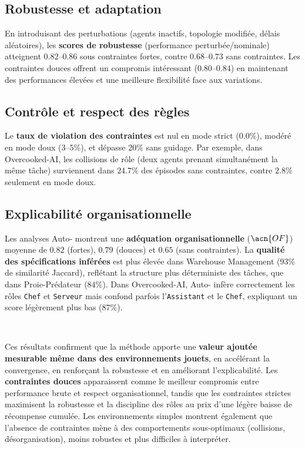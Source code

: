 \subsection*{Robustesse et adaptation}

En introduisant des perturbations (agents inactifs, topologie modifiée, délais aléatoires), les \textbf{scores de robustesse} (performance perturbée/nominale) atteignent $0.82$–$0.86$ sous contraintes fortes, contre $0.68$–$0.73$ sans contraintes.
Les contraintes douces offrent un compromis intéressant ($0.80$–$0.84$) en maintenant des performances élevées et une meilleure flexibilité face aux variations.

\subsection*{Contrôle et respect des règles}

Le \textbf{taux de violation des contraintes} est nul en mode strict ($0.0\%$), modéré en mode doux ($3$–$5\%$), et dépasse $20\%$ sans guidage.
Par exemple, dans Overcooked-AI, les collisions de rôle (deux agents prenant simultanément la même tâche) surviennent dans $24.7\%$ des épisodes sans contraintes, contre $2.8\%$ seulement en mode doux.

\subsection*{Explicabilité organisationnelle}

Les analyses Auto- montrent une \textbf{adéquation organisationnelle} ($\acn{OF}$) moyenne de $0.82$ (fortes), $0.79$ (douces) et $0.65$ (sans contraintes).
La \textbf{qualité des spécifications inférées} est plus élevée dans Warehouse Management ($93\%$ de similarité Jaccard), reflétant la structure plus déterministe des tâches, que dans Proie-Prédateur ($84\%$).
Dans Overcooked-AI, Auto- infère correctement les rôles \texttt{Chef} et \texttt{Serveur} mais confond parfois l’\texttt{Assistant} et le \texttt{Chef}, expliquant un score légèrement plus bas ($87\%$).

\

Ces résultats confirment que la méthode  apporte une \textbf{valeur ajoutée mesurable même dans des environnements jouets}, en accélérant la convergence, en renforçant la robustesse et en améliorant l’explicabilité.
Les \textbf{contraintes douces} apparaissent comme le meilleur compromis entre performance brute et respect organisationnel, tandis que les contraintes strictes maximisent la robustesse et la discipline des rôles au prix d’une légère baisse de récompense cumulée.
Les environnements simples montrent également que l’absence de contraintes mène à des comportements sous-optimaux (collisions, désorganisation), moins robustes et plus difficiles à interpréter.


